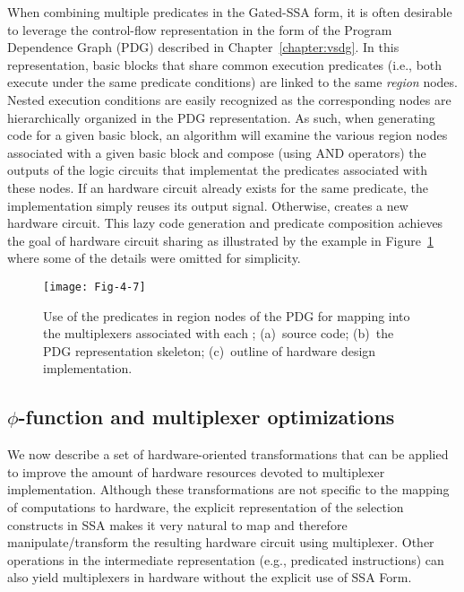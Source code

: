 When combining multiple predicates in the Gated-SSA form, it is often desirable to leverage the control-flow representation in the form of the Program Dependence Graph (PDG) described in Chapter~\ref{chapter:vsdg}. 
In this representation, basic blocks that share common execution predicates (i.e., both execute under the same predicate conditions) are linked to the same {\em region} nodes. 
Nested execution conditions are easily recognized as the corresponding nodes are hierarchically organized in the PDG representation. 
As such, when generating code for a given basic block, an algorithm will examine the various region nodes associated with a given basic block and compose (using AND operators) the outputs of the logic circuits that implementat the predicates associated with these nodes. 
If an hardware circuit already exists for the same predicate, the implementation simply reuses its output signal. 
Otherwise, creates a new hardware circuit. 
This lazy code generation and predicate composition achieves the goal of hardware circuit sharing as illustrated by the example in Figure~\ref{fig:Fig.4.7} where some of the details were omitted for simplicity.

\begin{figure}[htb]
\centering
\texttt{[image: Fig-4-7]}
\caption{Use of the predicates in region nodes of the PDG for mapping into the multiplexers associated with each \phifun; 
  (a)~source code; 
  (b)~the PDG representation skeleton; 
  (c)~outline of hardware design implementation.}
\label{fig:Fig.4.7}
\end{figure}


\subsection{$\phi$-function and multiplexer optimizations}
We now describe a set of hardware-oriented transformations that can be applied to improve the amount of hardware resources devoted to multiplexer implementation. 
Although these transformations are not specific to the mapping of computations to hardware, the explicit representation of the selection constructs in SSA makes it very natural to map and therefore manipulate/transform the resulting hardware circuit using multiplexer. 
Other operations in the intermediate representation (e.g., predicated instructions) can also yield multiplexers in hardware without the explicit use of SSA Form.

